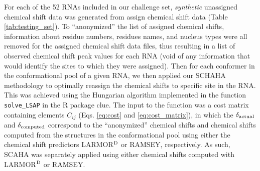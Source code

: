 \documentclass[journal=jcisd8,manuscript=article,layout=onecolumn]{achemso}
\begin{document}
For each of the 52 RNAs included in our challenge set, \textit{synthetic} unassigned chemical shift data was generated from assign chemical shift data (Table \ref{tab:testing_set}). To  ``anonymized''  the list of assigned chemical shifts, information about residue numbers, residues names, and nucleus types were all removed for the assigned chemical shift data files, thus resulting in a list of observed chemical shift peak values for each RNA (void of any information that would identify the sites to which they were assigned). Then for each conformer in the conformational pool of a given RNA, we then applied our SCHAHA methodology to optimally reassign the chemical shifts to specific site in the RNA. This was achieved using the Hungarian algorithm implemented in the function {\texttt{solve\_LSAP}} in the R package clue\cite{hornik2005a}. The input to the function was a cost matrix containing elements $C_{ij}$ (Eqs. \ref{eq:cost} and \ref{eq:cost_matrix}), in which the $\delta_{\rm actual}$ and $\delta_{\rm computed}$ correspond to the ``anonymized''  chemical shifts and chemical shifts computed from the structures in the conformational pool using either the chemical shift predictors LARMOR$^{\rm D}$\cite{frank2014simple} or  RAMSEY\cite{frank2013prediction}, respectively. As such, SCAHA was separately applied using either chemical shifts computed with  LARMOR$^{\rm D}$ or RAMSEY.
\end{document}
